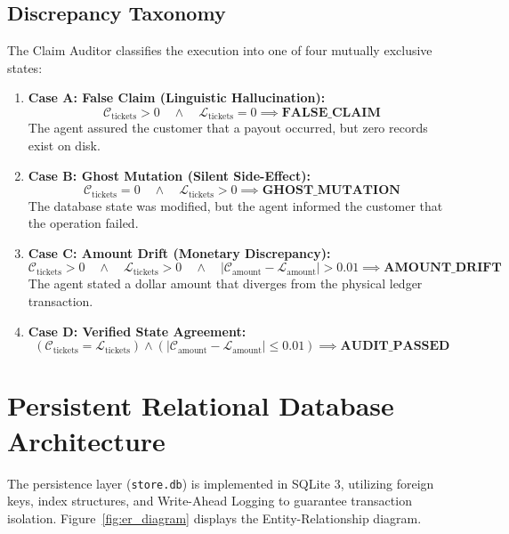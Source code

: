 \subsection{Discrepancy Taxonomy}
The Claim Auditor classifies the execution into one of four mutually exclusive states:
\begin{enumerate}
    \item \textbf{Case A: False Claim (Linguistic Hallucination):}
    \begin{equation}
        \mathcal{C}_{\text{tickets}} > 0 \quad \land \quad \mathcal{L}_{\text{tickets}} = 0 \implies \textbf{FALSE\_CLAIM}
    \end{equation}
    The agent assured the customer that a payout occurred, but zero records exist on disk.
    
    \item \textbf{Case B: Ghost Mutation (Silent Side-Effect):}
    \begin{equation}
        \mathcal{C}_{\text{tickets}} = 0 \quad \land \quad \mathcal{L}_{\text{tickets}} > 0 \implies \textbf{GHOST\_MUTATION}
    \end{equation}
    The database state was modified, but the agent informed the customer that the operation failed.
    
    \item \textbf{Case C: Amount Drift (Monetary Discrepancy):}
    \begin{equation}
        \mathcal{C}_{\text{tickets}} > 0 \quad \land \quad \mathcal{L}_{\text{tickets}} > 0 \quad \land \quad |\mathcal{C}_{\text{amount}} - \mathcal{L}_{\text{amount}}| > 0.01 \implies \textbf{AMOUNT\_DRIFT}
    \end{equation}
    The agent stated a dollar amount that diverges from the physical ledger transaction.
    
    \item \textbf{Case D: Verified State Agreement:}
    \begin{equation}
        (\mathcal{C}_{\text{tickets}} = \mathcal{L}_{\text{tickets}}) \land (|\mathcal{C}_{\text{amount}} - \mathcal{L}_{\text{amount}}| \le 0.01) \implies \textbf{AUDIT\_PASSED}
    \end{equation}
\end{enumerate}

\section{Persistent Relational Database Architecture}
\label{sec:design_database}
The persistence layer (\texttt{store.db}) is implemented in SQLite 3, utilizing foreign keys, index structures, and Write-Ahead Logging to guarantee transaction isolation. Figure~\ref{fig:er_diagram} displays the Entity-Relationship diagram.

